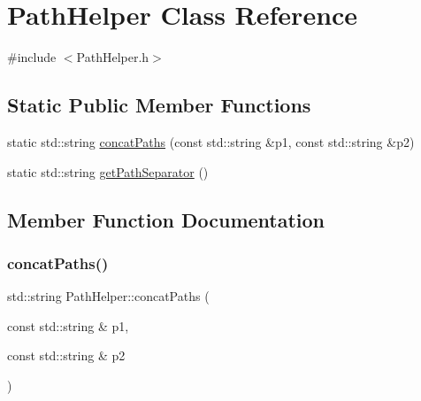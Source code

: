 \hypertarget{class_path_helper}{}\section{Path\+Helper Class Reference}
\label{class_path_helper}


{\ttfamily \#include $<$Path\+Helper.\+h$>$}

\subsection*{Static Public Member Functions}
\begin{DoxyCompactItemize}
\item 
static std\+::string \hyperlink{class_path_helper_a4f5f750586edd95d7095f0dc50052282}{concat\+Paths} (const std\+::string \&p1, const std\+::string \&p2)
\item 
static std\+::string \hyperlink{class_path_helper_af3f3b7923ba996a37f7ba2509519fc4e}{get\+Path\+Separator} ()
\end{DoxyCompactItemize}


\subsection{Member Function Documentation}
\mbox{\label{class_path_helper_a4f5f750586edd95d7095f0dc50052282}} 
\subsubsection{\texorpdfstring{concat\+Paths()}{concatPaths()}}
{\footnotesize\ttfamily std\+::string Path\+Helper\+::concat\+Paths (\begin{DoxyParamCaption}\item[{const std\+::string \&}]{p1,  }\item[{const std\+::string \&}]{p2 }\end{DoxyParamCaption})\hspace{0.3cm}{\ttfamily [static]}}

\mbox{\label{class_path_helper_af3f3b7923ba996a37f7ba2509519fc4e}} 
